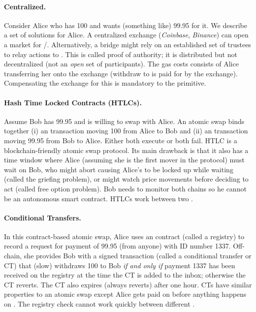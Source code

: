 \paragraph*{Centralized.} Consider Alice who has 100 \ethtwo and wants (something like) 99.95 \ethone for it. We describe a set of solutions for Alice. A centralized exchange (\eg \textit{Coinbase}, \textit{Binance}) can open a market for \ethtwo/\ethone. Alternatively, a bridge might rely on an established set of trustees to relay \layertwo actions to \layerone. This is called proof of authority; it is distributed but not decentralized (\ie not an \textit{open} set of participants). The gas costs consists of Alice transferring her \ethtwo onto the exchange (withdraw to \layerone is paid for by the exchange). Compensating the exchange for this is mandatory to the primitive. 

\paragraph*{Hash Time Locked Contracts (HTLCs).} Assume Bob has 99.95 \ethone and is willing to swap with Alice. An atomic swap binds together (i) an \layertwo transaction moving 100 \ethtwo from Alice to Bob and (ii) an \layerone transaction moving 99.95 \ethone from Bob to Alice. Either both execute or both fail. HTLC is a blockchain-friendly atomic swap protocol. Its main drawback is that it also has a time window where Alice (assuming she is the first mover in the protocol) must wait on Bob, who might abort causing Alice's \ethtwo to be locked up while waiting (called the griefing problem), or might watch price movements before deciding to act (called free option problem). Bob needs to monitor both chains so he cannot be an autonomous smart contract. HTLCs work between two \layertwos. 

\paragraph*{Conditional Transfers.} In this contract-based atomic swap, Alice uses an \layerone contract (called a registry) to record a request for payment of 99.95 \ethone (from anyone) with ID number 1337. Off-chain, she provides Bob with a signed \layertwo transaction (called a conditional transfer or CT) that (slow) withdraws 100 \ethtwo to Bob \textit{if and only if} payment 1337 has been received on the \layerone registry at the time the CT is added to the inbox; otherwise the CT reverts. The CT also expires (always reverts) after one hour. CTs have similar properties to an atomic swap except Alice gets paid on \layerone before anything happens on \layertwo. The registry check cannot work quickly between different \layertwos. 

